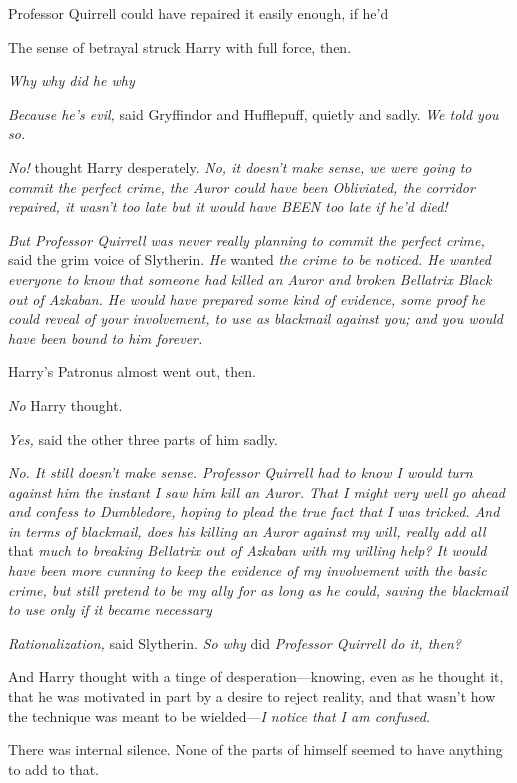 Professor Quirrell could have repaired it easily enough, if he'd{\el}

The sense of betrayal struck Harry with full force, then.

\emph{Why{\el} why did he{\el} why{\el}}

\emph{Because he's evil,} said Gryffindor and Hufflepuff, quietly and sadly.
\emph{We told you so.}

\emph{No!} thought Harry desperately. \emph{No, it doesn't make sense, we were
going to commit the perfect crime, the Auror could have been Obliviated, the
corridor repaired, it wasn't too late but it would have BEEN too late if he'd
died!}

\emph{But Professor Quirrell was never really planning to commit the perfect
crime,} said the grim voice of Slytherin. \emph{He} wanted \emph{the crime to
be noticed. He wanted everyone to know that someone had killed an Auror and
broken Bellatrix Black out of Azkaban. He would have prepared some kind of
evidence, some proof he could reveal of your involvement, to use as blackmail
against you; and you would have been bound to him forever.}

Harry's Patronus almost went out, then.

\emph{No{\el}} Harry thought.

\emph{Yes,} said the other three parts of him sadly.

\emph{No. It still doesn't make sense. Professor Quirrell had to know I would
turn against him the instant I saw him kill an Auror. That I might very well go
ahead and confess to Dumbledore, hoping to plead the true fact that I was
tricked. And{\el} in terms of blackmail, does his killing an Auror against
my will, really add all} that \emph{much to breaking Bellatrix out of Azkaban
with my willing help? It would have been more cunning to keep the evidence of
my involvement with the basic crime, but still pretend to be my ally for as
long as he could, saving the blackmail to use only if it became
necessary{\el}}

\emph{Rationalization,} said Slytherin. \emph{So why} did \emph{Professor
Quirrell do it, then?}

And Harry thought with a tinge of desperation---knowing, even as he thought it,
that he was motivated in part by a desire to reject reality, and that wasn't
how the technique was meant to be wielded---\emph{I notice that I am confused.}

There was internal silence. None of the parts of himself seemed to have
anything to add to that.

